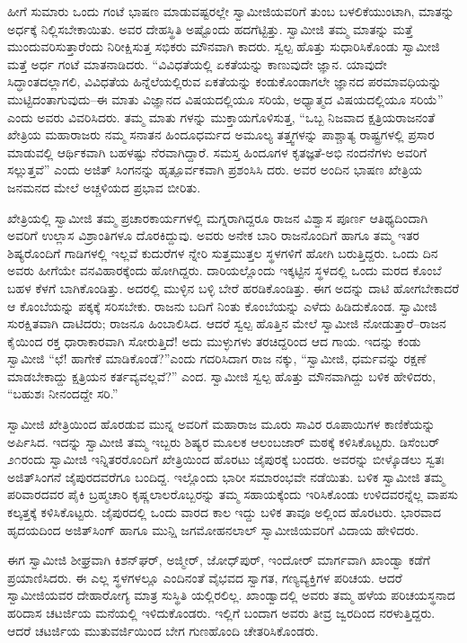 ಹೀಗೆ ಸುಮಾರು ಒಂದು ಗಂಟೆ ಭಾಷಣ ಮಾಡುವಷ್ಟರಲ್ಲೇ ಸ್ವಾಮೀಜಿಯವರಿಗೆ ತುಂಬ ಬಳಲಿಕೆಯುಂಟಾಗಿ, ಮಾತನ್ನು ಅರ್ಧಕ್ಕೆ ನಿಲ್ಲಿಸಬೇಕಾಯಿತು. ಅವರ ದೇಹಸ್ಥಿತಿ ಅಷ್ಟೊಂದು ಹದಗೆಟ್ಟಿತ್ತು. ಸ್ವಾಮೀಜಿ ತಮ್ಮ ಮಾತನ್ನು ಮತ್ತೆ ಮುಂದುವರಿಸುತ್ತಾರೆಂದು ನಿರೀಕ್ಷಿಸುತ್ತ ಸಭಿಕರು ಮೌನವಾಗಿ ಕಾದರು. ಸ್ವಲ್ಪ ಹೊತ್ತು ಸುಧಾರಿಸಿಕೊಂಡು ಸ್ವಾಮೀಜಿ ಮತ್ತೆ ಅರ್ಧ ಗಂಟೆ ಮಾತನಾಡಿದರು. “ವಿವಿಧತೆಯಲ್ಲಿ ಏಕತೆಯನ್ನು ಕಾಣುವುದೇ ಜ್ಞಾನ. ಯಾವುದೇ ಸಿದ್ಧಾಂತದಲ್ಲಾಗಲಿ, ವಿವಿಧತೆಯ ಹಿನ್ನೆಲೆಯಲ್ಲಿರುವ ಏಕತೆಯನ್ನು ಕಂಡುಕೊಂಡಾಗಲೇ ಜ್ಞಾನದ ಪರಮಾವಧಿಯನ್ನು ಮುಟ್ಟಿದಂತಾಗುವುದು–ಈ ಮಾತು ವಿಜ್ಞಾನದ ವಿಷಯದಲ್ಲಿಯೂ ಸರಿಯೆ, ಅಧ್ಯಾತ್ಮದ ವಿಷಯದಲ್ಲಿಯೂ ಸರಿಯೆ” ಎಂದು ಅವರು ವಿವರಿಸಿದರು. ತಮ್ಮ ಮಾತು ಗಳನ್ನು ಮುಕ್ತಾಯಗೊಳಿಸುತ್ತ, “ಒಬ್ಬ ನಿಜವಾದ ಕ್ಷತ್ರಿಯರಾಜನಂತೆ ಖೇತ್ರಿಯ ಮಹಾರಾಜರು ನಮ್ಮ ಸನಾತನ ಹಿಂದೂಧರ್ಮದ ಅಮೂಲ್ಯ ತತ್ತ್ವಗಳನ್ನು ಪಾಶ್ಚಾತ್ಯ ರಾಷ್ಟ್ರಗಳಲ್ಲಿ ಪ್ರಸಾರ ಮಾಡುವಲ್ಲಿ ಆರ್ಥಿಕವಾಗಿ ಬಹಳಷ್ಟು ನೆರವಾಗಿದ್ದಾರೆ. ಸಮಸ್ತ ಹಿಂದೂಗಳ ಕೃತಜ್ಞತೆ-ಅಭಿ ನಂದನೆಗಳು ಅವರಿಗೆ ಸಲ್ಲುತ್ತವೆ” ಎಂದು ಅಜಿತ್ ಸಿಂಗನನ್ನು ಹೃತ್ಪೂರ್ವಕವಾಗಿ ಪ್ರಶಂಸಿಸಿ ದರು. ಅವರ ಅಂದಿನ ಭಾಷಣ ಖೇತ್ರಿಯ ಜನಮನದ ಮೇಲೆ ಅಚ್ಚಳಿಯದ ಪ್ರಭಾವ ಬೀರಿತು.

ಖೇತ್ರಿಯಲ್ಲಿ ಸ್ವಾಮೀಜಿ ತಮ್ಮ ಪ್ರಚಾರಕಾರ್ಯಗಳಲ್ಲಿ ಮಗ್ನರಾಗಿದ್ದರೂ ರಾಜನ ವಿಶ್ವಾಸ ಪೂರ್ಣ ಆತಿಥ್ಯದಿಂದಾಗಿ ಅವರಿಗೆ ಉಲ್ಲಾಸ ವಿಶ್ರಾಂತಿಗಳೂ ದೊರಕಿದ್ದುವು. ಅವರು ಅನೇಕ ಬಾರಿ ರಾಜನೊಂದಿಗೆ ಹಾಗೂ ತಮ್ಮ ಇತರ ಶಿಷ್ಯರೊಂದಿಗೆ ಗಾಡಿಗಳಲ್ಲಿ ಇಲ್ಲವೆ ಕುದುರೆಗಳ ನ್ನೇರಿ ಸುತ್ತಮುತ್ತಲ ಸ್ಥಳಗಳಿಗೆ ಹೋಗಿ ಬರುತ್ತಿದ್ದರು. ಒಂದು ದಿನ ಅವರು ಹೀಗೆಯೇ ವನವಿಹಾರಕ್ಕೆಂದು ಹೋಗಿದ್ದರು. ದಾರಿಯಲ್ಲೊಂದು ಇಕ್ಕಟ್ಟಿನ ಸ್ಥಳದಲ್ಲಿ ಒಂದು ಮರದ ಕೊಂಬೆ ಬಹಳ ಕೆಳಗೆ ಬಾಗಿಕೊಂಡಿತ್ತು. ಅದರಲ್ಲಿ ಮುಳ್ಳಿನ ಬಳ್ಳಿ ಬೇರೆ ಹರಡಿಕೊಂಡಿತ್ತು. ಈಗ ಅದನ್ನು ದಾಟಿ ಹೋಗಬೇಕಾದರೆ ಆ ಕೊಂಬೆಯನ್ನು ಪಕ್ಕಕ್ಕೆ ಸರಿಸಬೇಕು. ರಾಜನು ಬದಿಗೆ ನಿಂತು ಕೊಂಬೆಯನ್ನು ಎಳೆದು ಹಿಡಿದುಕೊಂಡ. ಸ್ವಾಮೀಜಿ ಸುರಕ್ಷಿತವಾಗಿ ದಾಟಿದರು; ರಾಜನೂ ಹಿಂಬಾಲಿಸಿದ. ಆದರೆ ಸ್ವಲ್ಪ ಹೊತ್ತಿನ ಮೇಲೆ ಸ್ವಾಮೀಜಿ ನೋಡುತ್ತಾರೆ–ರಾಜನ ಕೈಯಿಂದ ರಕ್ತ ಧಾರಾಕಾರವಾಗಿ ಸೋರುತ್ತಿದೆ! ಅದು ಮುಳ್ಳುಗಳು ತರಚಿದ್ದರಿಂದ ಆದ ಗಾಯ. ಇದನ್ನು ಕಂಡು ಸ್ವಾಮೀಜಿ “ಛೆ! ಹಾಗೇಕೆ ಮಾಡಿಕೊಂಡೆ?”ಎಂದು ಗದರಿಸಿದಾಗ ರಾಜ ನಕ್ಕು, “ಸ್ವಾಮೀಜಿ, ಧರ್ಮವನ್ನು ರಕ್ಷಣೆ ಮಾಡಬೇಕಾದ್ದು ಕ್ಷತ್ರಿಯನ ಕರ್ತವ್ಯವಲ್ಲವೆ?” ಎಂದ. ಸ್ವಾಮೀಜಿ ಸ್ವಲ್ಪ ಹೊತ್ತು ಮೌನವಾಗಿದ್ದು ಬಳಿಕ ಹೇಳಿದರು, “ಬಹುಶಃ ನೀನಂದದ್ದೇ ಸರಿ.”

ಸ್ವಾಮೀಜಿ ಖೇತ್ರಿಯಿಂದ ಹೊರಡುವ ಮುನ್ನ ಅವರಿಗೆ ಮಹಾರಾಜ ಮೂರು ಸಾವಿರ ರೂಪಾಯಿಗಳ ಕಾಣಿಕೆಯನ್ನು ಅರ್ಪಿಸಿದ. ಇದನ್ನು ಸ್ವಾಮೀಜಿ ತಮ್ಮ ಇಬ್ಬರು ಶಿಷ್ಯರ ಮೂಲಕ ಆಲಂಬಜಾರ್ ಮಠಕ್ಕೆ ಕಳಿಸಿಕೊಟ್ಟರು. ಡಿಸೆಂಬರ್ ೨೧ರಂದು ಸ್ವಾಮೀಜಿ ಇನ್ನಿತರರೊಂದಿಗೆ ಖೇತ್ರಿಯಿಂದ ಹೊರಟು ಜೈಪುರಕ್ಕೆ ಬಂದರು. ಅವರನ್ನು ಬೀಳ್ಕೊಡಲು ಸ್ವತಃ ಅಜಿತ್​ಸಿಂಗನೆ ಜೈಪುರದವರೆಗೂ ಬಂದಿದ್ದ. ಇಲ್ಲೊಂದು ಭಾರೀ ಸಮಾರಂಭವೇ ನಡೆಯಿತು. ಬಳಿಕ ಸ್ವಾಮೀಜಿ ತಮ್ಮ ಪರಿವಾರದವರ ಪೈಕಿ ಬ್ರಹ್ಮಚಾರಿ ಕೃಷ್ಣಲಾಲರೊಬ್ಬರನ್ನು ತಮ್ಮ ಸಹಾಯಕ್ಕೆಂದು ಇರಿಸಿಕೊಂಡು ಉಳಿದವರನ್ನೆಲ್ಲ ವಾಪಸು ಕಲ್ಕತ್ತಕ್ಕೆ ಕಳಿಸಿಕೊಟ್ಟರು. ಜೈಪುರದಲ್ಲಿ ಒಂದು ವಾರದ ಕಾಲ ಇದ್ದು ಬಳಿಕ ತಾವೂ ಅಲ್ಲಿಂದ ಹೊರಟರು. ಭಾರವಾದ ಹೃದಯದಿಂದ ಅಜಿತ್​ಸಿಂಗ್ ಹಾಗೂ ಮುನ್ಷಿ ಜಗಮೋಹನಲಾಲ್ ಸ್ವಾಮೀಜಿಯವರಿಗೆ ವಿದಾಯ ಹೇಳಿದರು.

ಈಗ ಸ್ವಾಮೀಜಿ ಶೀಘ್ರವಾಗಿ ಕಿಶನ್​ಘರ್, ಅಜ್ಮೀರ್, ಜೋಧ್​ಪುರ್, ಇಂದೋರ್ ಮಾರ್ಗವಾಗಿ ಖಾಂಡ್ವಾ ಕಡೆಗೆ ಪ್ರಯಾಣಿಸಿದರು. ಈ ಎಲ್ಲ ಸ್ಥಳಗಳಲ್ಲೂ ಎಂದಿನಂತೆ ವೈಭವದ ಸ್ವಾಗತ, ಗಣ್ಯವ್ಯಕ್ತಿಗಳ ಪರಿಚಯ. ಆದರೆ ಸ್ವಾಮೀಜಿಯವರ ದೇಹಾರೋಗ್ಯ ಮಾತ್ರ ಸುಸ್ಥಿತಿ ಯಲ್ಲಿರಲಿಲ್ಲ. ಖಾಂಡ್ವಾದಲ್ಲಿ ಅವರು ತಮ್ಮ ಹಳೆಯ ಪರಿಚಯಸ್ಥನಾದ ಹರಿದಾಸ ಚಟರ್ಜಿಯ ಮನೆಯಲ್ಲಿ ಇಳಿದುಕೊಂಡರು. ಇಲ್ಲಿಗೆ ಬಂದಾಗ ಅವರು ತೀವ್ರ ಜ್ವರದಿಂದ ನರಳುತ್ತಿದ್ದರು. ಆದರೆ ಚಟರ್ಜಿಯ ಮುತುವರ್ಜಿಯಿಂದ ಬೇಗ ಗುಣಹೊಂದಿ ಚೇತರಿಸಿಕೊಂಡರು.

